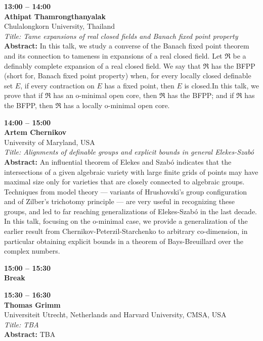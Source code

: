 \documentclass[10pt,a4paper]{article}
\begin{document}
\begin{tcolorbox}[talkbox]
\textbf{13:00 -- 14:00} \\
\textbf{Athipat Thamrongthanyalak} \\
Chulalongkorn University, Thailand \\
\textit{Title: Tame expansions of real closed fields and Banach fixed point property} \\
\textbf{Abstract:} In this talk, we study a converse of the Banach fixed point theorem and its connection to tameness in expansions of a real closed field. Let $\mathfrak R$ be a definably complete expansion of a real closed field. We say that $\mathfrak R$ has the BFPP (short for, Banach fixed point property) when, for every locally closed definable set $E$, if every contraction on $E$ has a fixed point, then $E$ is closed.In this talk, we prove that if $\mathfrak R$ has an o-minimal open core, then $\mathfrak R$ has the BFPP; and if $\mathfrak R$ has the BFPP, then $\mathfrak R$ has a locally o-minimal open core.
\end{tcolorbox}
\begin{tcolorbox}[talkbox]
\textbf{14:00 -- 15:00} \\
\textbf{Artem Chernikov} \\
University of Maryland, USA \\
\textit{Title: Alignments of definable groups and explicit bounds in general Elekes-Szabó} \\
\textbf{Abstract:} An influential theorem of Elekes and Szabó indicates that the intersections of a given algebraic variety with large finite grids of points may have maximal size only for varieties that are closely connected to algebraic groups.  Techniques from model theory --- variants of Hrushovski's group configuration and of Zilber's trichotomy principle --- are very useful in recognizing these groups, and led to far reaching generalizations of Elekes-Szabó in the last decade. In this talk, focusing on the o-minimal case, we provide a generalization of the earlier result from Chernikov-Peterzil-Starchenko to arbitrary co-dimension, in particular obtaining explicit bounds in a theorem of Bays-Breuillard over the complex numbers.
\end{tcolorbox}
\begin{tcolorbox}[talkbox]
\textbf{15:00 -- 15:30} \\
\textbf{Break}
\end{tcolorbox}
\begin{tcolorbox}[talkbox]
\textbf{15:30 -- 16:30} \\
\textbf{Thomas Grimm} \\
Universiteit Utrecht, Netherlands and Harvard University, CMSA, USA \\
\textit{Title: TBA} \\
\textbf{Abstract:} TBA
\end{tcolorbox}
\end{document}
